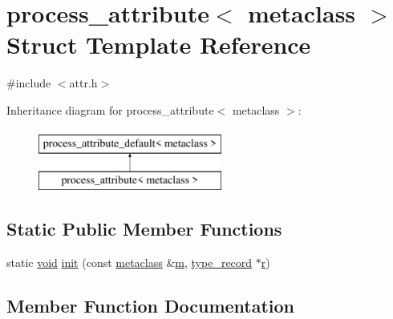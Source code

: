\hypertarget{structprocess__attribute_3_01metaclass_01_4}{}\section{process\+\_\+attribute$<$ metaclass $>$ Struct Template Reference}
\label{structprocess__attribute_3_01metaclass_01_4}


{\ttfamily \#include $<$attr.\+h$>$}

Inheritance diagram for process\+\_\+attribute$<$ metaclass $>$\+:\begin{figure}[H]
\begin{center}
\leavevmode
\includegraphics[height=2.000000cm]{structprocess__attribute_3_01metaclass_01_4}
\end{center}
\end{figure}
\subsection*{Static Public Member Functions}
\begin{DoxyCompactItemize}
\item 
static \mbox{\hyperlink{_s_d_l__opengles2__gl2ext_8h_ae5d8fa23ad07c48bb609509eae494c95}{void}} \mbox{\hyperlink{structprocess__attribute_3_01metaclass_01_4_a93c57efb424d1d87fa3135fe45572fae}{init}} (const \mbox{\hyperlink{structmetaclass}{metaclass}} \&\mbox{\hyperlink{_s_d_l__opengl__glext_8h_af593500c283bf1a787a6f947f503a5c2}{m}}, \mbox{\hyperlink{structtype__record}{type\+\_\+record}} $\ast$\mbox{\hyperlink{_s_d_l__opengl_8h_a42ce7cdc612e53abee15043f80220d97}{r}})
\end{DoxyCompactItemize}


\subsection{Member Function Documentation}
\mbox{\label{structprocess__attribute_3_01metaclass_01_4_a93c57efb424d1d87fa3135fe45572fae}} 
